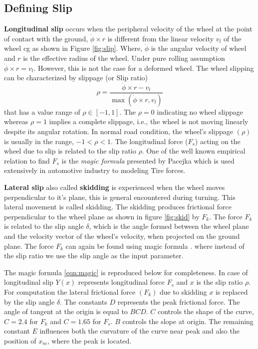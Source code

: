 {\subsection{Defining Slip}
\textbf{Longitudinal slip} occurs when the peripheral velocity of the wheel at the point of contact with the ground, $\dot{\phi} \times r$ is different from the linear velocity $v_l$ of the wheel cg as shown in Figure \ref{fig:slip}. Where, $\dot{\phi}$ is the angular velocity of wheel and $r$ is the effective radius of the wheel. Under pure rolling assumption  $\dot{\phi} \times r=v_l$. However, this is not the case for a deformed wheel. The wheel slipping can be characterized by
slippage (or Slip ratio) \[\rho = \frac{\dot{\phi} \times r - v_l}{\max(\dot{\phi} \times r,v_l)}\] that has a value range of $ \rho \in [-1, 1]$. The $\rho = 0$
indicating no wheel slippage whereas $\rho = 1$ implies a complete slippage, i.e., the wheel is not moving linearly despite its angular rotation. In normal road condition, the wheel's slippage $(\rho)$is usually in the range, $-1<\rho<1 $. The  longitudinal force ($F_s$) acting on the wheel due to slip is related to the slip ratio $\rho$. One of the well known empirical relation to find $F_s$ is the \textit{ magic formula} presented by Pacejka \cite{pacejka1992magic} which is used extensively in automotive industry to modeling Tire forces. 

 \textbf{Lateral slip }also called \textbf{skidding} is experienced when the wheel moves perpendicular to it's plane, this is general encountered during turning. This lateral movement is called skidding. The skidding produces frictional force perpendicular to the wheel plane as shown in figure \ref{fig:skid} by $F_k$. The force $F_k$ is related to the slip angle $\delta$, which is the angle formed between the wheel plane and the velocity vector of the wheel's velocity, when projected on the ground plane.
 The force $F_k$ can again be found using magic formula \cite{pacejka1992magic}. where instead of the slip ratio we use the slip angle as the input parameter.
 
 The magic formula \ref{eqn:magic} is reproduced below for completeness. In case of longitudinal slip $Y(x)$ represents longitudinal force $F_s$ and $x$ is the slip ratio $\rho$. For computation the lateral frictional  force $(F_k)$ due to skidding $x$ is replaced by the slip angle $\delta$. The constants $D$ represents the peak frictional force. The angle of  tangent at the origin is equal to $BCD$. $C$ controls the shape of the curve, $C=2.4$ for $F_k$ and  $C=1.65$ for $F_s$. $B$ controls the slope at origin. The remaining constant $E$ influences both the curvature of the curve near peak and also the position of $x_m$, where the peak is located.
 
}
